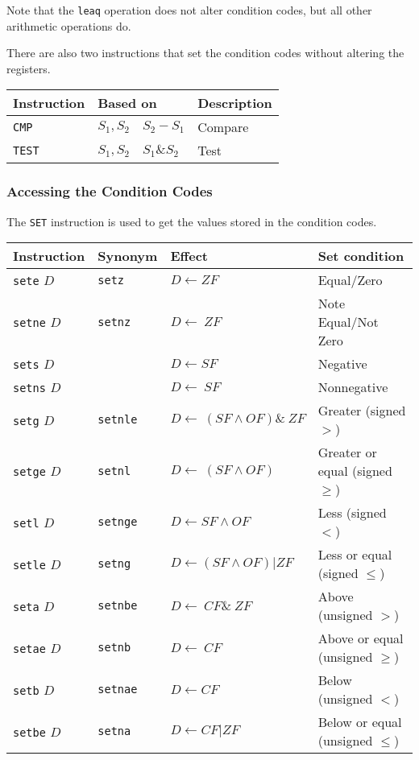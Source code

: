 \documentclass[10pt]{armath}
\newcommand{\s}[1]{\texttt{#1}}
\begin{document}
Note that the \s{leaq} operation does not alter condition codes, but all other
arithmetic operations do.

There are also two instructions that set the condition codes without altering
the registers.

\begin{center}
  \begin{tabular}{l l l}
    Instruction & Based on & Description\\
    \hline
    \s{CMP} & $S_1,S_2\quad S_2-S_1$ & Compare\\
    \s{TEST} & $S_1,S_2\quad S_1 \& S_2$ & Test\\
    \hline
  \end{tabular}
\end{center}

\subsubsection{Accessing the Condition Codes}%
\label{ssub:accessing_the_condition_codes}

The \s{SET} instruction is used to get the values stored in the condition
codes.

\begin{center}
  \begin{tabular}{l l l l}
    Instruction & Synonym & Effect & Set condition\\
    \hline
    \s{sete} $D$ & \s{setz} & $D\leftarrow ZF$ & Equal/Zero\\
    \s{setne} $D$ & \s{setnz} & $D\leftarrow ~ZF$ & Note Equal/Not Zero\\
    \s{sets} $D$ & & $D\leftarrow SF$ & Negative\\
    \s{setns} $D$ & & $D\leftarrow ~SF$ & Nonnegative\\
    \s{setg} $D$ & \s{setnle} & $D\leftarrow ~(SF\wedge OF)\&~ZF$ & Greater
    (signed $>$)\\
    \s{setge} $D$ & \s{setnl} & $D\leftarrow ~(SF\wedge OF)$ & Greater or equal
    (signed $\geq$)\\
    \s{setl} $D$ & \s{setnge} & $D\leftarrow SF\wedge OF$ &Less
    (signed $<$)\\
    \s{setle} $D$ & \s{setng} & $D\leftarrow (SF\wedge OF) | ZF$ & Less or equal
    (signed $\leq$)\\
    \s{seta} $D$ & \s{setnbe} & $D\leftarrow ~CF\&~ZF$ & Above (unsigned $>$)\\
    \s{setae} $D$ & \s{setnb} & $D\leftarrow ~CF$ & Above or equal (unsigned
    $\geq$)\\
    \s{setb} $D$ & \s{setnae} & $D\leftarrow CF$ & Below (unsigned $<$)\\
    \s{setbe} $D$ & \s{setna} & $D\leftarrow CF|ZF$ & Below or equal (unsigned
    $\leq$)\\
    \hline
  \end{tabular}
\end{center}
\end{document}
